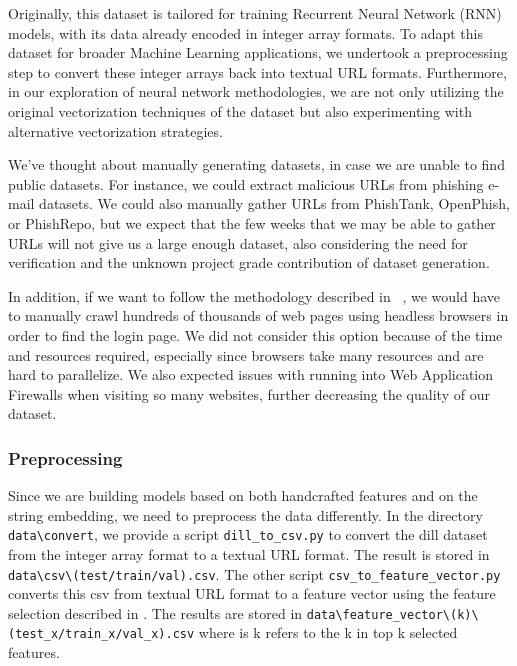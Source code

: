 \documentclass{article}
\begin{document}
    Originally, this dataset is tailored for training Recurrent Neural Network (RNN) models, with its data already encoded in integer array formats.
    To adapt this dataset for broader Machine Learning applications, we undertook a preprocessing step to convert these integer arrays back into textual URL formats.
    Furthermore, in our exploration of neural network methodologies, we are not only utilizing the original vectorization techniques of the dataset but also experimenting with alternative vectorization strategies.

    We've thought about manually generating datasets, in case we are unable to find public datasets.
    For instance, we could extract malicious URLs from phishing e-mail datasets.
    We could also manually gather URLs from PhishTank, OpenPhish, or PhishRepo, but we expect that the few weeks that we may be able to gather URLs will not give us a large enough dataset, also considering the need for verification and the unknown project grade contribution of dataset generation.

    In addition, if we want to follow the methodology described in ~\cite{PhishingLoginURLDetection}, we would have to manually crawl hundreds of thousands of web pages using headless browsers in order to find the login page.
    We did not consider this option because of the time and resources required, especially since browsers take many resources and are hard to parallelize.
    We also expected issues with running into Web Application Firewalls when visiting so many websites, further decreasing the quality of our dataset.

    \subsubsection{Preprocessing}\label{subsubsec:preprocessing}
    Since we are building models based on both handcrafted features and on the string embedding, we need to preprocess the data differently.
    In the directory \texttt{data\textbackslash convert}, we provide a script \texttt{dill\_to\_csv.py} to convert the dill dataset from the integer array format to a textual URL format.
    The result is stored in \texttt{data\textbackslash csv\textbackslash (test/train/val).csv}.
    The other script \texttt{csv\_to\_feature\_vector.py} converts this csv from textual URL format to a feature vector using the feature selection described in .
    The results are stored in \texttt{data\textbackslash feature\_vector\textbackslash (k)\textbackslash (test\_x/train\_x/val\_x).csv} where is k refers to the k in top k selected features.
\end{document}
